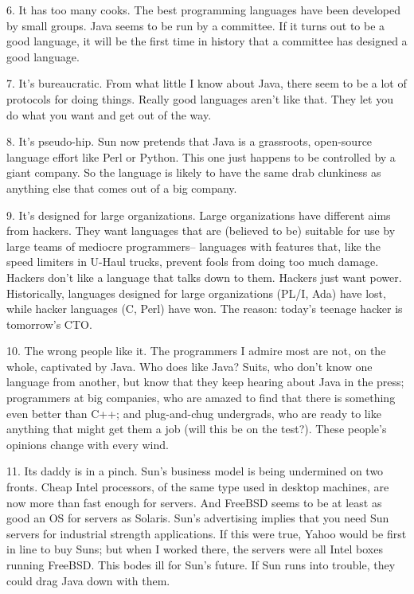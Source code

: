 6. It has too many cooks.
                  The best programming languages have been developed by small
                  groups. Java seems to be run by a committee. If it turns out
                  to be a good language, it will be the first time in history
                  that a committee has designed a good language.

7.
                  It's bureaucratic. From what little I know about Java, there
                  seem to be a lot of protocols for doing things. Really good
                  languages aren't like that. They let you do what you want and
                  get out of the way.

8. It's pseudo-hip. Sun now
                  pretends that Java is a grassroots, open-source language
                  effort like Perl or Python. This one just happens to be
                  controlled by a giant company. So the language is likely to
                  have the same drab clunkiness as anything else that comes out
                  of a big company.

9. It's designed for large
                  organizations. Large organizations have different aims from
                  hackers. They want languages that are (believed to be)
                  suitable for use by large teams of mediocre programmers--
                  languages with features that, like the speed limiters in
                  U-Haul trucks, prevent fools from doing too much damage.
                  Hackers don't like a language that talks down to them. Hackers
                  just want power. Historically, languages designed for large
                  organizations (PL/I, Ada) have lost, while hacker languages
                  (C, Perl) have won. The reason: today's teenage hacker is
                  tomorrow's CTO.

10. The wrong people like it. The
                  programmers I admire most are not, on the whole, captivated by
                  Java. Who does like Java? Suits, who don't know one language
                  from another, but know that they keep hearing about Java in
                  the press; programmers at big companies, who are amazed to
                  find that there is something even better than C++; and
                  plug-and-chug undergrads, who are ready to like anything that
                  might get them a job (will this be on the test?). These
                  people's opinions change with every wind.

11. Its
                  daddy is in a pinch. Sun's business model is being undermined
                  on two fronts. Cheap Intel processors, of the same type used
                  in desktop machines, are now more than fast enough for
                  servers. And FreeBSD seems to be at least as good an OS for
                  servers as Solaris. Sun's advertising implies that you need
                  Sun servers for industrial strength applications. If this were
                  true, Yahoo would be first in line to buy Suns; but when I
                  worked there, the servers were all Intel boxes running
                  FreeBSD. This bodes ill for Sun's future. If Sun runs into
                  trouble, they could drag Java down with them.

